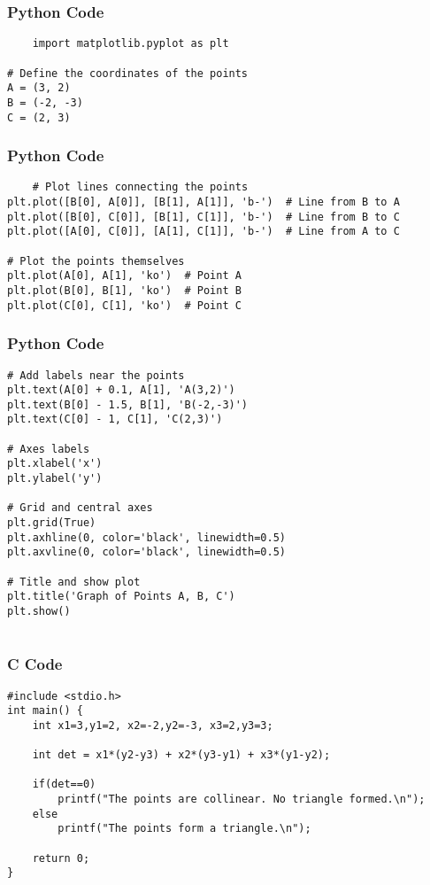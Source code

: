 \documentclass{beamer}
\begin{document}
\begin{frame}[fragile]
    \frametitle{Python Code}
    \begin{lstlisting}
    import matplotlib.pyplot as plt

# Define the coordinates of the points
A = (3, 2)
B = (-2, -3)
C = (2, 3)

\end{lstlisting}
\end{frame}

\begin{frame}[fragile]
    \frametitle{Python Code}
    \begin{lstlisting}
    # Plot lines connecting the points
plt.plot([B[0], A[0]], [B[1], A[1]], 'b-')  # Line from B to A
plt.plot([B[0], C[0]], [B[1], C[1]], 'b-')  # Line from B to C
plt.plot([A[0], C[0]], [A[1], C[1]], 'b-')  # Line from A to C

# Plot the points themselves
plt.plot(A[0], A[1], 'ko')  # Point A
plt.plot(B[0], B[1], 'ko')  # Point B
plt.plot(C[0], C[1], 'ko')  # Point C

\end{lstlisting}
\end{frame}

\begin{frame}[fragile]
    \frametitle{Python Code}
    \begin{lstlisting}
# Add labels near the points
plt.text(A[0] + 0.1, A[1], 'A(3,2)')
plt.text(B[0] - 1.5, B[1], 'B(-2,-3)')
plt.text(C[0] - 1, C[1], 'C(2,3)')

# Axes labels
plt.xlabel('x')
plt.ylabel('y')

# Grid and central axes
plt.grid(True)
plt.axhline(0, color='black', linewidth=0.5)
plt.axvline(0, color='black', linewidth=0.5)

# Title and show plot
plt.title('Graph of Points A, B, C')
plt.show()


\end{lstlisting}
\end{frame}


\begin{frame}[fragile]
\frametitle{C Code}
\begin{lstlisting}
#include <stdio.h>
int main() {
    int x1=3,y1=2, x2=-2,y2=-3, x3=2,y3=3;

    int det = x1*(y2-y3) + x2*(y3-y1) + x3*(y1-y2);

    if(det==0)
        printf("The points are collinear. No triangle formed.\n");
    else
        printf("The points form a triangle.\n");

    return 0;
}


\end{lstlisting}

\end{frame}
\end{document}
